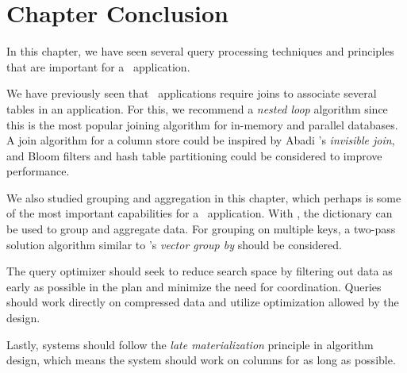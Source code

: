 \section{Chapter Conclusion}
\label{sec:Chapter Conclusion}
In this chapter, we have seen several query processing techniques and principles that are important for a \bd~application.

We have previously seen that \bd~applications require joins to associate several tables in an application. For this, we recommend a \textit{nested loop} algorithm since this is the most popular joining algorithm for in-memory and parallel databases. A join algorithm for a column store could be inspired by Abadi \ea's \textit{invisible join}, and Bloom filters and hash table partitioning could be considered to improve performance.

We also studied grouping and aggregation in this chapter, which perhaps is some of the most important capabilities for a \bd~application. With \de, the dictionary can be used to group and aggregate data. For grouping on multiple keys, a two-pass solution algorithm similar to \oracle's \textit{vector group by} should be considered.

The query optimizer should seek to reduce search space by filtering out data as early as possible in the plan and minimize the need for coordination. Queries should work directly on compressed data and utilize optimization allowed by the design. 

Lastly, systems should follow the \textit{late materialization} principle in algorithm design, which means the system should work on columns for as long as possible. 
